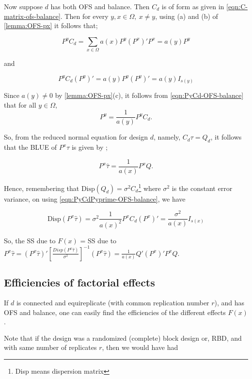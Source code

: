 \documentclass[12pt]{article}
\theoremstyle{definition}
\begin{document}
Now suppose $d$ has both OFS and balance. Then $C_d$ is of form as given in \eqref{eqn:C-matrix-ofs-balance}. Then for every $y, x \in \Omega, \  x \neq y$,  using (a) and (b) of \cref{lemma:OFS-px} it follows that;

\begin{equation}
    P^yC_d  =  \sum_{x \in \Omega} a(x)P^y (P^x)'P^x = a(y) P^y \label{eqn:PyCd-OFS-balance}
\end{equation}

and

\begin{equation}
    P^yC_d(P^y)' = a(y) P^y (P^y)' = a(y) I_{s(y)} \label{eqn:PyCdPyprime-OFS-balance}
\end{equation}

Since $a(y)\neq 0$ by \cref{lemma:OFS-px}(c), it follows from \eqref{eqn:PyCd-OFS-balance} that for all $y \in \Omega$, 
$$P^y = \frac{1}{a(y)}P^yC_d.$$ 

So, from the reduced normal equation for design $d$, namely,  $C_d\tau=Q_d$, it follows  that the BLUE of $P^x\tau$ is given by ;

$$ P^x\hat{\tau} = \frac{1}{a(x)} P^x Q.$$ 

Hence, remembering that $\mbox{Disp}(Q_d) = \sigma^2 C_d$\footnote{Disp means dispersion matrix} where $\sigma^2$ is the constant error variance, on using \eqref{eqn:PyCdPyprime-OFS-balance}, we have

\begin{equation}
    \mbox{Disp}(P^x\hat{\tau})=  \sigma^2 \frac{1}{{a(x)}^2} P^x C_d (P^x)' =  \frac{\sigma^2} {a(x)} I_{s(x)} \label{eqn:Disp-Px-ofs-balance}
\end{equation}

So, the SS due to $F(x)$ =  SS due to $P^x\hat{\tau} =  (P^x\hat{\tau})'\left[\frac{Disp(P^x\hat{\tau})}{\sigma^2}\right]^{-1}(P^x\hat{\tau})=\frac{1}{a(x)} Q'(P^x)'P^xQ.$

\subsection{Efficiencies of factorial effects}

If $d$ is connected and equireplicate (with common replication number $r$), and has OFS and balance, one can easily find the efficiencies of the different effects $F(x)$.

Note that if the design was  a randomized (complete) block design or, RBD, and with same number of replicates $r$,  then we would have had
\end{document}
